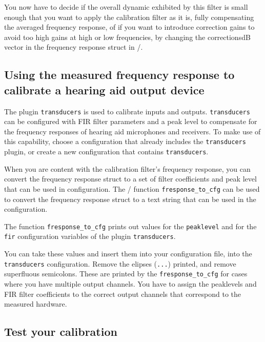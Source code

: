 \documentclass[11pt,a4paper,twoside]{article}
\newcommand{\+}{\discretionary{\mbox{\scriptsize$\hookleftarrow$}}{}{}}
\begin{document}
You now have to decide if the overall dynamic exhibited by this filter
is small enough that you want to apply the calibration filter as it
is, fully compensating the averaged frequency response, of if you want
to introduce correction gains to avoid too high gains at high or low
frequencies, by changing the correctionsdB vector in the frequency
response struct in \Octave{}/\Matlab{}.

\subsection{Using the measured frequency response to calibrate a hearing aid output device}

The \mha{} plugin \texttt{transducers} is used to calibrate inputs and outputs.
%
\texttt{transducers} can be configured with FIR filter parameters and a peak level
to compensate for the frequency responses of hearing aid microphones and receivers.
%
To make use of this capability, choose a \mha{} configuration that already includes
the \texttt{transducers} plugin, or create a new configuration that contains
\texttt{transducers}.

When you are content with the calibration filter's frequency response,
you can convert the frequency response struct to a set of filter
coefficients and peak level that can be used in \mha{} configuration.
%
The \Octave{}/\Matlab{} function \texttt{fresponse\_to\_cfg} can be
used to convert the frequency response struct to a text string that
can be used in the \mha{} configuration.

The function \texttt{fresponse\_to\_cfg} prints out values for the
\texttt{peaklevel} and for the \texttt{fir} configuration variables of
the \mha{} plugin \texttt{transducers}.

You can take these values and insert them into your configuration file,
into the \texttt{transducers} configuration.
%
Remove the elipses (\texttt{...}) printed, and remove superfluous
semicolons.
%
These are printed by the \texttt{fresponse\_to\_cfg} for cases where
you have multiple output channels. You have to assign the peaklevels
and FIR filter coefficients to the correct output channels that
correspond to the measured hardware.

\subsection{Test your calibration}
\end{document}

